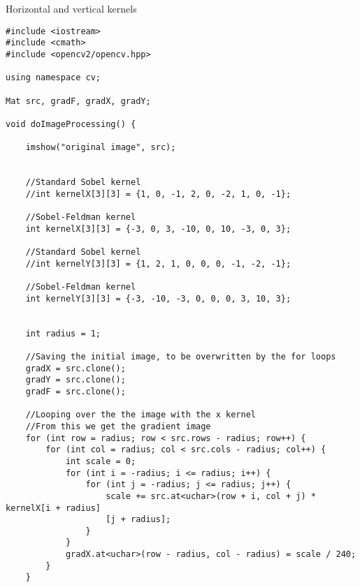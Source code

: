 \begin{listing}[H]
    	\caption{Horizontal and vertical kernels}
    	\label{listing:code1}
    	\begin{verbatim}
#include <iostream>
#include <cmath>
#include <opencv2/opencv.hpp>

using namespace cv;

Mat src, gradF, gradX, gradY;

void doImageProcessing() {
	
	imshow("original image", src);
	
	
	//Standard Sobel kernel
	//int kernelX[3][3] = {1, 0, -1, 2, 0, -2, 1, 0, -1};
	
	//Sobel-Feldman kernel
	int kernelX[3][3] = {-3, 0, 3, -10, 0, 10, -3, 0, 3};
	
	//Standard Sobel kernel
	//int kernelY[3][3] = {1, 2, 1, 0, 0, 0, -1, -2, -1};
	
	//Sobel-Feldman kernel
	int kernelY[3][3] = {-3, -10, -3, 0, 0, 0, 3, 10, 3};
	
	
	int radius = 1;
	
	//Saving the initial image, to be overwritten by the for loops
	gradX = src.clone();
	gradY = src.clone();
	gradF = src.clone();
	
	//Looping over the the image with the x kernel
	//From this we get the gradient image
	for (int row = radius; row < src.rows - radius; row++) {
		for (int col = radius; col < src.cols - radius; col++) {
			int scale = 0;
			for (int i = -radius; i <= radius; i++) {
				for (int j = -radius; j <= radius; j++) {
					scale += src.at<uchar>(row + i, col + j) * kernelX[i + radius]
					[j + radius];
				}
			}
			gradX.at<uchar>(row - radius, col - radius) = scale / 240;
		}
	}
    	\end{verbatim}
    \end{listing}


